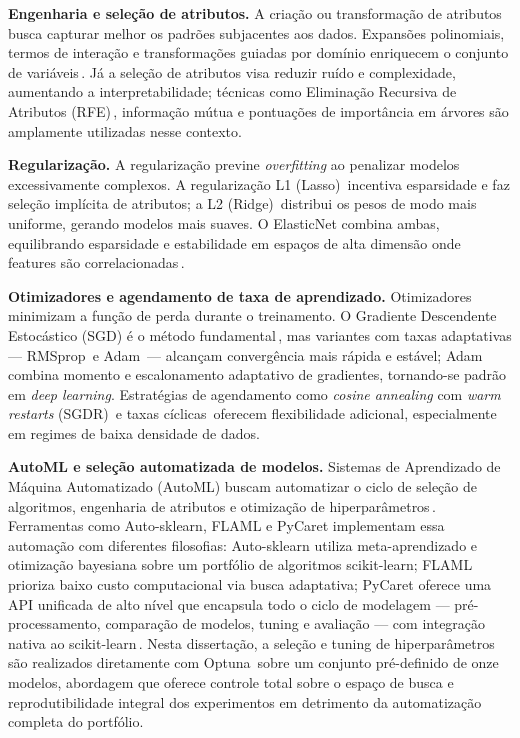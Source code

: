 \textbf{Engenharia e seleção de atributos.}
A criação ou transformação de atributos busca capturar melhor os padrões subjacentes aos dados. Expansões polinomiais, termos de interação e transformações guiadas por domínio enriquecem o conjunto de variáveis\,\cite{kuhn2013applied}. Já a seleção de atributos visa reduzir ruído e complexidade, aumentando a interpretabilidade; técnicas como Eliminação Recursiva de Atributos (RFE)\,\cite{guyon2002gene}, informação mútua e pontuações de importância em árvores são amplamente utilizadas nesse contexto.

\textbf{Regularização.}
A regularização previne \textit{overfitting} ao penalizar modelos excessivamente complexos. A regularização L1 (Lasso)\,\cite{tibshirani1996regression} incentiva esparsidade e faz seleção implícita de atributos; a L2 (Ridge)\,\cite{hoerl1970ridge} distribui os pesos de modo mais uniforme, gerando modelos mais suaves. O ElasticNet combina ambas, equilibrando esparsidade e estabilidade em espaços de alta dimensão onde features são correlacionadas\,\cite{zou2005regularization}.

\textbf{Otimizadores e agendamento de taxa de aprendizado.}
Otimizadores minimizam a função de perda durante o treinamento. O Gradiente Descendente Estocástico (SGD) é o método fundamental\,\cite{bottou2012sgd}, mas variantes com taxas adaptativas — RMSprop\,\cite{tieleman2012lecture} e Adam\,\cite{kingma2015adam} — alcançam convergência mais rápida e estável; Adam combina momento e escalonamento adaptativo de gradientes, tornando-se padrão em \textit{deep learning}. Estratégias de agendamento como \textit{cosine annealing} com \emph{warm restarts} (SGDR)\,\cite{loshchilov2017sgdr} e taxas cíclicas\,\cite{smith2017cyclical} oferecem flexibilidade adicional, especialmente em regimes de baixa densidade de dados.

\textbf{AutoML e seleção automatizada de modelos.} Sistemas de Aprendizado de Máquina Automatizado (AutoML) buscam automatizar o ciclo de seleção de algoritmos, engenharia de atributos e otimização de hiperparâmetros\,\cite{he2021automl}. Ferramentas como Auto-sklearn, FLAML e PyCaret implementam essa automação com diferentes filosofias: Auto-sklearn utiliza meta-aprendizado e otimização bayesiana sobre um portfólio de algoritmos scikit-learn; FLAML prioriza baixo custo computacional via busca adaptativa; PyCaret oferece uma API unificada de alto nível que encapsula todo o ciclo de modelagem — pré-processamento, comparação de modelos, tuning e avaliação — com integração nativa ao scikit-learn\,\cite{he2021automl}. Nesta dissertação, a seleção e tuning de hiperparâmetros são realizados diretamente com Optuna\,\cite{akiba2019optuna} sobre um conjunto pré-definido de onze modelos, abordagem que oferece controle total sobre o espaço de busca e reprodutibilidade integral dos experimentos em detrimento da automatização completa do portfólio.

